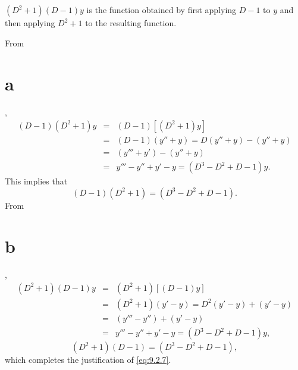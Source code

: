 \begin{example}
\begin{alist}
    \item %
    $(D^{2}+1)(D-1)y$ is the function obtained by first applying $D-1$ to $y$ and then applying
    $D^{2}+1$ to the resulting function.
  \end{alist}
  From \part{a},
  \begin{equation}
    \label{eq:9.2.8}
    \begin{array}{rcl}
      (D-1)(D^{2}+1)y & = & (D-1)[(D^{2}+1)y]                 \\
                      & = & (D-1)(y''+y)=D(y''+y)-(y''+y)     \\
                      & = & (y'''+y')-(y''+y)                 \\
                      & = & y'''-y''+y'-y=(D^{3}-D^{2}+D-1)y.
    \end{array}
  \end{equation}
  This implies that
  \[
    (D-1)(D^{2}+1)=(D^{3}-D^{2}+D-1).
  \]
  From \part{b},
  \begin{equation}
    \label{eq:9.2.9}
    \begin{array}{rcl}
      (D^{2}+1)(D-1)y & = & (D^{2}+1)[(D-1)y]                  \\
                      & = & (D^{2}+1)(y'-y)=D^{2}(y'-y)+(y'-y) \\
                      & = & (y'''-y'')+(y'-y)                  \\
                      & = & y'''-y''+y'-y=(D^{3}-D^{2}+D-1)y,
    \end{array}
  \end{equation}
  \[
    (D^{2}+1)(D-1)=(D^{3}-D^{2}+D-1),
  \]
  which completes the justification of \eqref{eq:9.2.7}.
\end{example}

